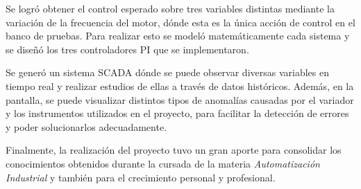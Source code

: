 Se logró obtener el control esperado sobre tres variables distintas mediante la variación de la frecuencia del motor, dónde esta es la única acción de control en el banco de pruebas. Para realizar esto se modeló matemáticamente cada sistema y se diseñó los tres controladores PI que se implementaron.


Se generó un sistema SCADA dónde se puede observar diversas variables en tiempo real y realizar estudios de ellas a través de datos históricos. Además, en la pantalla, se puede visualizar distintos tipos de anomalías causadas por el variador y los instrumentos utilizados en el proyecto, para facilitar la detección de errores y poder solucionarlos adecuadamente.

Finalmente, la realización del proyecto tuvo un gran aporte para consolidar los conocimientos obtenidos durante la cursada de la materia \textit{Automatización Industrial} y también para el crecimiento personal y profesional.



\newpage